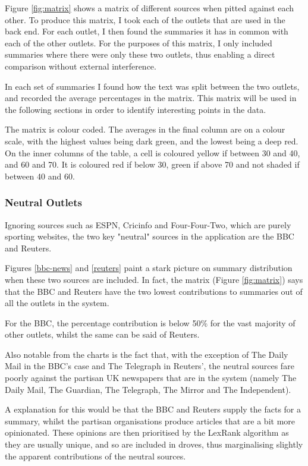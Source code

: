 \documentclass[12pt]{article}
\begin{document}
Figure \ref{fig:matrix} shows a matrix of different sources when pitted against each other. To produce this matrix, I took each of the outlets that are used in the back end. For each outlet, I then found the summaries it has in common with each of the other outlets. For the purposes of this matrix, I only included summaries where there were only these two outlets, thus enabling a direct comparison without external interference.

In each set of summaries I found how the text was split between the two outlets, and recorded the average percentages in the matrix. This matrix will be used in the following sections in order to identify interesting points in the data. 

The matrix is colour coded. The averages in the final column are on a colour scale, with the highest values being dark green, and the lowest being a deep red. On the inner columns of the table, a cell is coloured yellow if between 30 and 40, and 60 and 70. It is coloured red if below 30, green if above 70 and not shaded if between 40 and 60.

\subsubsection{Neutral Outlets}

Ignoring sources such as ESPN, Cricinfo and Four-Four-Two, which are purely sporting websites, the two key "neutral" sources in the application are the BBC and Reuters.

Figures \ref{bbc-news} and \ref{reuters} paint a stark picture on summary distribution when these two sources are included. In fact, the matrix (Figure \ref{fig:matrix}) says that the BBC and Reuters have the two lowest contributions to summaries out of all the outlets in the system. 

For the BBC, the percentage contribution is below 50\% for the vast majority of other outlets, whilst the same can be said of Reuters.

Also notable from the charts is the fact that, with the exception of The Daily Mail in the BBC's case and The Telegraph in Reuters', the neutral sources fare poorly against the partisan UK newspapers that are in the system (namely The Daily Mail, The Guardian, The Telegraph, The Mirror and The Independent). 

A explanation for this would be that the BBC and Reuters supply the facts for a summary, whilst the partisan organisations produce articles that are a bit more opinionated. These opinions are then prioritised by the LexRank algorithm as they are usually unique, and so are included in droves, thus marginalising slightly the apparent contributions of the neutral sources. 
\end{document}
